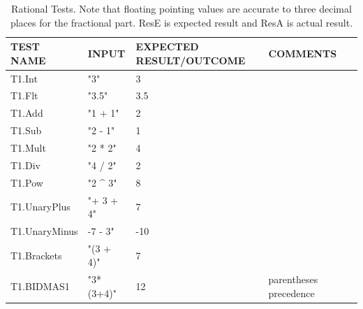 \documentclass[a4paper, oneside, 11pt]{report}
\begin{document}
\begin{table}
\centering
\caption{Rational Tests. Note that floating pointing values are accurate to three decimal places for the fractional part. ResE is expected result and ResA is actual result. \\}
\label{Table2}
\begin{tabular}{|p{1.5in}|p{1.5in}|p{1.6in}|p{1.6in}|p{2.4in}|} 
\hline
TEST NAME       & INPUT                     & EXPECTED RESULT/OUTCOME                & COMMENTS                                \\ 
\hline
T1.Int          & "3"                       & 3                                      &                                         \\ 
\hline
T1.Flt          & "3.5"                     & 3.5                                    &                                         \\ 
\hline
T1.Add          & "1 + 1"                   & 2                                      &                                         \\ 
\hline
T1.Sub          & "2 - 1"                   & 1                                      &                                         \\ 
\hline
T1.Mult         & "2 * 2"                   & 4                                      &                                         \\ 
\hline
T1.Div          & "4 / 2"                   & 2                                      &                                         \\ 
\hline
T1.Pow          & "2 \^{} 3"                & 8                                      &                                         \\ 
\hline
T1.UnaryPlus    & "+ 3 + 4"                 & 7                                      &                                         \\ 
\hline
T1.UnaryMinus   & -7 - 3"                   & -10                                    &                                         \\ 
\hline
T1.Brackets     & "(3 + 4)"                 & 7                                      &                                         \\ 
\hline
T1.BIDMAS1      & "3*(3+4)"                 & 12                                     & parentheses precedence                  \\ 

\end{tabular}
\end{table}
\end{document}

